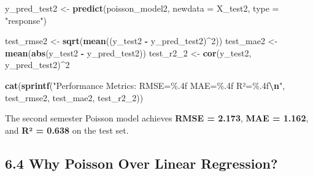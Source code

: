 \documentclass[
]{article}
\newenvironment{Shaded}{\begin{snugshade}}{\end{snugshade}}
\newcommand{\AttributeTok}[1]{\textcolor[rgb]{0.13,0.29,0.53}{#1}}
\newcommand{\DecValTok}[1]{\textcolor[rgb]{0.00,0.00,0.81}{#1}}
\newcommand{\FunctionTok}[1]{\textcolor[rgb]{0.13,0.29,0.53}{\textbf{#1}}}
\newcommand{\NormalTok}[1]{#1}
\newcommand{\OtherTok}[1]{\textcolor[rgb]{0.56,0.35,0.01}{#1}}
\newcommand{\SpecialCharTok}[1]{\textcolor[rgb]{0.81,0.36,0.00}{\textbf{#1}}}
\newcommand{\StringTok}[1]{\textcolor[rgb]{0.31,0.60,0.02}{#1}}
\begin{document}
\begin{Shaded}
\begin{Highlighting}[]
\NormalTok{y\_pred\_test2 }\OtherTok{\textless{}{-}} \FunctionTok{predict}\NormalTok{(poisson\_model2, }\AttributeTok{newdata =}\NormalTok{ X\_test2, }\AttributeTok{type =} \StringTok{"response"}\NormalTok{)}

\NormalTok{test\_rmse2 }\OtherTok{\textless{}{-}} \FunctionTok{sqrt}\NormalTok{(}\FunctionTok{mean}\NormalTok{((y\_test2 }\SpecialCharTok{{-}}\NormalTok{ y\_pred\_test2)}\SpecialCharTok{\^{}}\DecValTok{2}\NormalTok{))}
\NormalTok{test\_mae2 }\OtherTok{\textless{}{-}} \FunctionTok{mean}\NormalTok{(}\FunctionTok{abs}\NormalTok{(y\_test2 }\SpecialCharTok{{-}}\NormalTok{ y\_pred\_test2))}
\NormalTok{test\_r2\_2 }\OtherTok{\textless{}{-}} \FunctionTok{cor}\NormalTok{(y\_test2, y\_pred\_test2)}\SpecialCharTok{\^{}}\DecValTok{2}

\FunctionTok{cat}\NormalTok{(}\FunctionTok{sprintf}\NormalTok{(}\StringTok{"Performance Metrics: RMSE=\%.4f MAE=\%.4f R²=\%.4f}\SpecialCharTok{\textbackslash{}n}\StringTok{"}\NormalTok{,}
\NormalTok{          test\_rmse2, test\_mae2, test\_r2\_2))}
\end{Highlighting}
\end{Shaded}

The second semester Poisson model achieves \textbf{RMSE = 2.173},
\textbf{MAE = 1.162}, and \textbf{R² = 0.638} on the test set.

\subsection{6.4 Why Poisson Over Linear
Regression?}\label{why-poisson-over-linear-regression}
\end{document}
